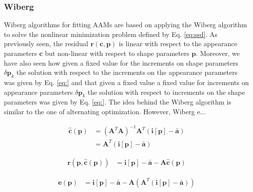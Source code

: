 \subsubsection{Wiberg}
\label{sec:wiberg}

Wiberg algorithms for fitting AAMs are based on applying the Wiberg algorithm \cite{Okatani2006} to solve the nonlinear minimization problem defined by Eq. \ref{eq:ssd}. As previously seen, the residual $\mathbf{r}(\mathbf{c}, \mathbf{p})$ is linear with respect to the appearance parameters $\mathbf{c}$ but non-linear with respect to shape parameters $\mathbf{p}$. Moreover, we have also seen how given a fixed value for the increments on shape parameters $\delta\mathbf{p}_k$ the solution with respect to the increments on the appearance parameters was given by Eq. \ref{eq:} and that given a fixed value a fixed value for increments on appearance parameters $\delta\mathbf{p}_k$ the solution with respect to increments on the shape parameters was given by Eq. \ref{eq:}. The idea behind the Wiberg algorithm is similar to the one of alternating optimization. However, Wiberg e...

\begin{equation}
    \begin{aligned}
        \hat{\mathbf{c}}(\mathbf{p}) & = (\mathbf{A}^T\mathbf{A})^{-1} \mathbf{A}^T \left( \mathbf{i}[\mathbf{p}] - \bar{\mathbf{a}} \right) 
        \\
        & = \mathbf{A}^T \left( \mathbf{i}[\mathbf{p}] - \bar{\mathbf{a}} \right) 
    \label{eq:ssd_appearance}
    \end{aligned}
\end{equation}

\begin{equation}
    \begin{aligned}
        \mathbf{r}(\mathbf{p}, \hat{\mathbf{c}}(\mathbf{p})) & = \mathbf{i}[\mathbf{p}] - \bar{\mathbf{a}} - \mathbf{A} \hat{\mathbf{c}}(\mathbf{p})
    \label{eq:ssd_appearance}
    \end{aligned}
\end{equation}

\begin{equation}
    \begin{aligned}
        \mathbf{e}(\mathbf{p}) & = \mathbf{i}[\mathbf{p}] - \bar{\mathbf{a}} - \mathbf{A} \left( \mathbf{A}^T \left( \mathbf{i}[\mathbf{p}] - \bar{\mathbf{a}} \right) \right)
    \label{eq:ssd_appearance}
    \end{aligned}
\end{equation}

